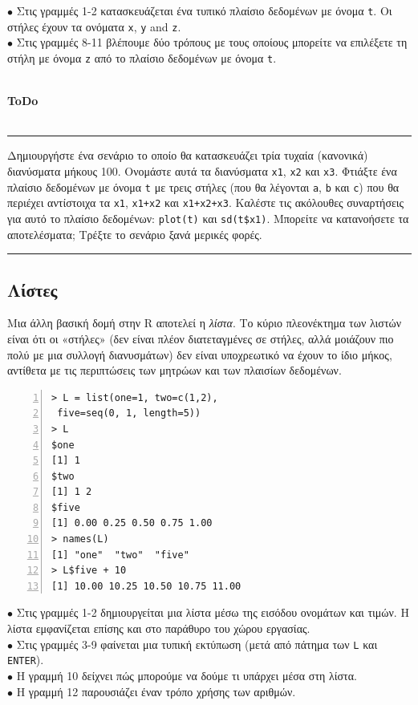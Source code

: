 \documentclass[a4paper,10pt,twocolumn]{article}
\newenvironment{ToDo} {
  \begin{flushright}
    \hfill
    \begin{minipage}{0.9\columnwidth}
    \textsf{\textbf{ToDo}} \\
      \vspace{-0.7cm}\\
      {\color{Gray}\rule[-0.05cm]{\columnwidth}{1.5pt}}} {
      {\color{Gray}\rule[0.3cm]{\columnwidth}{1.5pt}}
    \end{minipage}
    \vspace{0.3cm}
  \end{flushright}
  }
\begin{document}
\noindent $\bullet$ Στις γραμμές 1-2 κατασκευάζεται ένα τυπικό πλαίσιο δεδομένων με όνομα \texttt{t}. Οι στήλες
έχουν τα ονόματα \texttt{x}, \texttt{y} and \texttt{z}.\\
\noindent $\bullet$ Στις γραμμές 8-11 βλέπουμε δύο τρόπους με τους οποίους μπορείτε να επιλέξετε τη στήλη με 
όνομα \texttt{z} από το πλαίσιο δεδομένων με όνομα \texttt{t}.\\
\\

\begin{ToDo}
Δημιουργήστε ένα σενάριο το οποίο θα κατασκευάζει τρία τυχαία (κανονικά) διανύσματα μήκους 100. Ονομάστε
αυτά τα διανύσματα \texttt{x1}, \texttt{x2} και \texttt{x3}. Φτιάξτε ένα πλαίσιο δεδομένων με όνομα \texttt{t}
με τρεις στήλες (που θα λέγονται \texttt{a}, \texttt{b} και \texttt{c}) που θα περιέχει αντίστοιχα τα 
\texttt{x1}, \texttt{x1+x2} και \texttt{x1+x2+x3}. Καλέστε τις ακόλουθες συναρτήσεις για αυτό το πλαίσιο
δεδομένων: \texttt{plot(t)} και \texttt{sd(t\$x1)}. Μπορείτε να κατανοήσετε τα αποτελέσματα; Τρέξτε το
σενάριο ξανά μερικές φορές.\\
\end{ToDo}

\subsection{Λίστες}

Μια άλλη βασική δομή στην R αποτελεί η \emph{λίστα}. Το κύριο πλεονέκτημα των λιστών είναι ότι οι «στήλες»
(δεν είναι πλέον διατεταγμένες σε στήλες, αλλά μοιάζουν πιο πολύ με μια συλλογή διανυσμάτων) δεν είναι
υποχρεωτικό να έχουν το ίδιο μήκος, αντίθετα με τις περιπτώσεις των μητρώων και των πλαισίων δεδομένων.

\begin{Verbatim}[frame=single,numbers=left,gobble=0, xleftmargin=0.35cm, numbersep=0.1cm]
> L = list(one=1, two=c(1,2), 
 five=seq(0, 1, length=5))
> L
$one
[1] 1
$two
[1] 1 2
$five
[1] 0.00 0.25 0.50 0.75 1.00
> names(L)
[1] "one"  "two"  "five"
> L$five + 10
[1] 10.00 10.25 10.50 10.75 11.00
\end{Verbatim}

\noindent $\bullet$ Στις γραμμές 1-2 δημιουργείται μια λίστα μέσω της εισόδου ονομάτων και τιμών. Η λίστα
εμφανίζεται επίσης και στο παράθυρο του χώρου εργασίας.\\
\noindent $\bullet$ Στις γραμμές 3-9 φαίνεται μια τυπική εκτύπωση (μετά από πάτημα των \texttt{L} και
\texttt{ENTER}). \\
\noindent $\bullet$ Η γραμμή 10 δείχνει πώς μπορούμε να δούμε τι υπάρχει μέσα στη λίστα.\\
\noindent $\bullet$ Η γραμμή 12 παρουσιάζει έναν τρόπο χρήσης των αριθμών. \\
\end{document}
